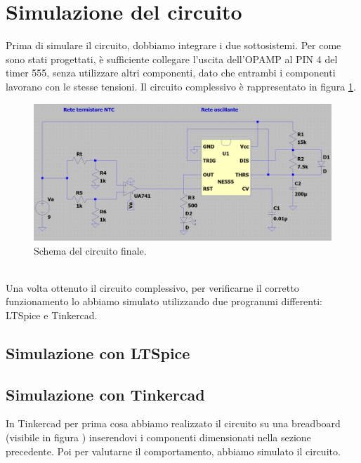 \documentclass{report}
\begin{document}
\newpage
\section{Simulazione del circuito}
Prima di simulare il circuito, dobbiamo integrare i due sottosistemi. Per come sono stati progettati, è sufficiente collegare l'uscita dell'OPAMP al PIN 4 del timer 555, senza utilizzare altri componenti, dato che entrambi i componenti lavorano con le stesse tensioni. Il circuito complessivo è rappresentato in figura \ref{figura:schemaFinale}.
\begin{figure}[h!]
	\centering
	\includegraphics[width=\textwidth]{immagini/schemaFinale}
	\caption{Schema del circuito finale.} 
	\label{figura:schemaFinale}
\end{figure}
\\Una volta ottenuto il circuito complessivo, per verificarne il corretto funzionamento lo abbiamo simulato utilizzando due programmi differenti: LTSpice e Tinkercad.  
\subsection{Simulazione con LTSpice}
\subsection{Simulazione con Tinkercad}
In Tinkercad per prima cosa abbiamo realizzato il circuito su una breadboard (visibile in figura ) inserendovi i componenti dimensionati nella sezione precedente.
Poi per valutarne il comportamento, abbiamo simulato il circuito.
\end{document}

